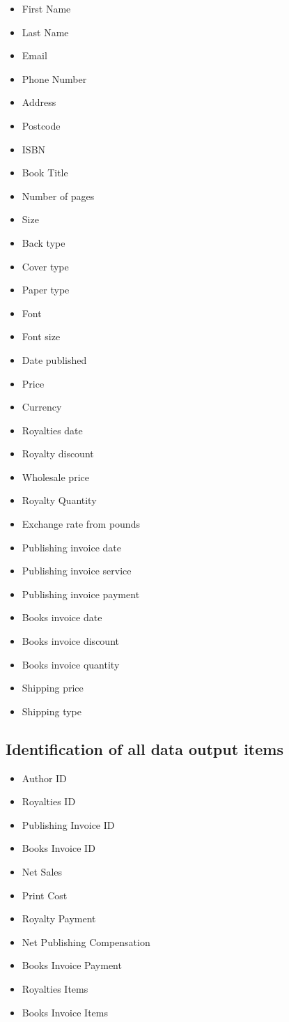 \begin{itemize}
    \item First Name
    \item Last Name
    \item Email
    \item Phone Number
    \item Address
    \item Postcode
    \item ISBN
    \item Book Title
    \item Number of pages
    \item Size
    \item Back type
    \item Cover type
    \item Paper type
    \item Font
    \item Font size
    \item Date published
    \item Price
    \item Currency
    \item Royalties date
    \item Royalty discount
    \item Wholesale price
    \item Royalty Quantity
    \item Exchange rate from pounds
    \item Publishing invoice date
    \item Publishing invoice service
    \item Publishing invoice payment
    \item Books invoice date
    \item Books invoice discount
    \item Books invoice quantity
    \item Shipping price
    \item Shipping type
\end{itemize}

\subsection{Identification of all data output items}

\begin{itemize}
    \item Author ID
    \item Royalties ID
    \item Publishing Invoice ID
    \item Books Invoice ID
    \item Net Sales
    \item Print Cost
    \item Royalty Payment
    \item Net Publishing Compensation
    \item Books Invoice Payment
    \item Royalties Items
    \item Books Invoice Items
\end{itemize}

